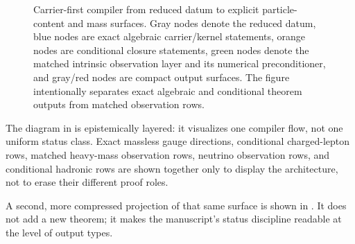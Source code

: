 \begin{figure}[p]
\caption{Carrier-first compiler from reduced datum to explicit particle-content and mass
surfaces. Gray nodes denote the reduced datum, blue nodes are exact algebraic carrier/kernel
statements, orange nodes are conditional closure statements, green nodes denote the matched
intrinsic observation layer and its numerical preconditioner, and gray/red nodes are compact
output surfaces. The figure intentionally separates exact algebraic and conditional theorem
outputs from matched observation rows.}
\label{fig:compiler-to-masses}
\end{figure}

The diagram in  is epistemically layered: it visualizes one
compiler flow, not one uniform status class. Exact massless gauge directions, conditional
charged-lepton rows, matched heavy-mass observation rows, neutrino observation rows, and
conditional hadronic rows are shown together only to display the architecture, not to erase
their different proof roles.

A second, more compressed projection of that same surface is shown in . It does not add a new theorem; it makes the manuscript's status discipline readable at the level of output types.
